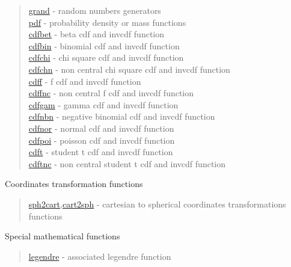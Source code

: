 \begin{quote}
\noindent
\hyperlink{grand}{grand} - random numbers generators \\
\hyperlink{pdf}{pdf} - probability density or mass functions \\
\hyperlink{cdfbet}{cdfbet} - beta cdf and invcdf function \\
\hyperlink{cdfbin}{cdfbin} - binomial cdf and invcdf function \\
\hyperlink{cdfchi}{cdfchi} - chi square cdf and invcdf function \\
\hyperlink{cdfchn}{cdfchn} - non central chi square cdf and invcdf function \\
\hyperlink{cdff}{cdff} - f cdf and invcdf function \\
\hyperlink{cdffnc}{cdffnc} - non central f cdf and invcdf function \\
\hyperlink{cdfgam}{cdfgam} - gamma cdf and invcdf function \\
\hyperlink{cdfnbn}{cdfnbn} - negative binomial cdf and invcdf function \\
\hyperlink{cdfnor}{cdfnor} - normal cdf and invcdf function \\
\hyperlink{cdfpoi}{cdfpoi} - poisson cdf and invcdf function \\
\hyperlink{cdft}{cdft} - student t cdf and invcdf function \\
\hyperlink{cdftnc}{cdftnc} - non central student t cdf and invcdf function \\
\end{quote}

Coordinates transformation functions

\begin{quote}
\noindent
\hyperlink{sph2cart}{sph2cart},\hyperlink{cart2sph}{cart2sph} -
cartesian to spherical coordinates transformations functions \\
\end{quote}


Special mathematical functions

\begin{quote}
\noindent
\hyperlink{legendre}{legendre} - associated legendre function\\
\end{quote}



 












 

 
 
 
 
 
 
 
 
 
 
 


